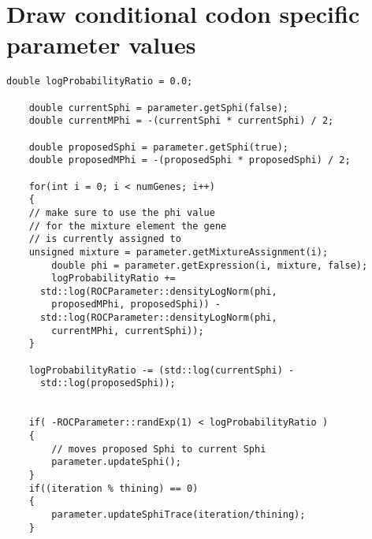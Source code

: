 \documentclass[11pt]{article}
\begin{document}
  \section{Draw conditional codon specific parameter values}
   \begin{lstlisting}[frame=single]
    double logProbabilityRatio = 0.0;

    double currentSphi = parameter.getSphi(false);
    double currentMPhi = -(currentSphi * currentSphi) / 2;

    double proposedSphi = parameter.getSphi(true);
    double proposedMPhi = -(proposedSphi * proposedSphi) / 2;

    for(int i = 0; i < numGenes; i++)
    {
	// make sure to use the phi value 
	// for the mixture element the gene
	// is currently assigned to
	unsigned mixture = parameter.getMixtureAssignment(i);
        double phi = parameter.getExpression(i, mixture, false);
        logProbabilityRatio += 
	  std::log(ROCParameter::densityLogNorm(phi, 
	    proposedMPhi, proposedSphi)) - 
	  std::log(ROCParameter::densityLogNorm(phi, 
	    currentMPhi, currentSphi));
    }

    logProbabilityRatio -= (std::log(currentSphi) - 
      std::log(proposedSphi));


    if( -ROCParameter::randExp(1) < logProbabilityRatio )
    {
        // moves proposed Sphi to current Sphi
        parameter.updateSphi();
    }
    if((iteration % thining) == 0)
    {
        parameter.updateSphiTrace(iteration/thining);
    }
   \end{lstlisting}
  
  
  
\end{document}

